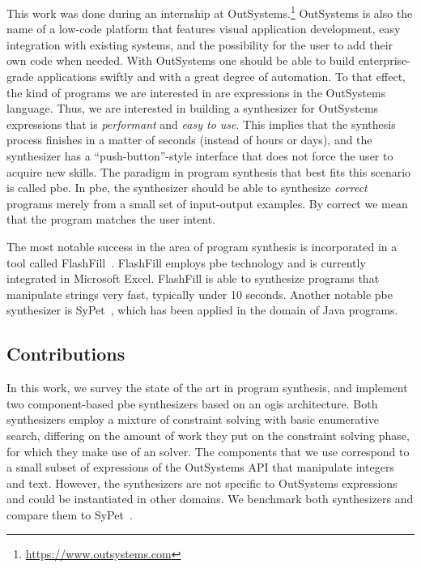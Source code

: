 This work was done during an internship at
OutSystems.\footnote{\url{https://www.outsystems.com}} 
OutSystems is also the name of a low-code platform that features visual
application development, easy integration with existing systems, and the
possibility for the user to add their own code when needed.
With OutSystems one should be able to build enterprise-grade applications
swiftly and with a great degree of
automation.
To that effect, the kind of programs we are interested in are expressions in the
OutSystems language.
Thus, we are interested in building a synthesizer for OutSystems expressions
that is \textit{performant} and \textit{easy to use}.
This implies that the synthesis process finishes in a matter of seconds
(instead of hours or days), and the synthesizer has a ``push-button''-style
interface that does not force the user to acquire new skills.
The paradigm in program synthesis that best fits this scenario is called
\gls{pbe}.
In \gls{pbe}, the synthesizer should be able to synthesize \textit{correct}
programs merely from a small set of input-output examples.
By correct we mean that the program matches the user intent.

The most notable success in the area of program synthesis is incorporated in a
tool called FlashFill~\cite{Gulwani:2011}.
FlashFill employs \gls{pbe} technology and is currently integrated in Microsoft
Excel.
FlashFill is able to synthesize programs that manipulate strings very fast,
typically under 10 seconds.
Another notable \gls{pbe} synthesizer is SyPet~\cite{Feng:2017:CSC}, which has
been applied in the domain of Java programs.

\subsection{Contributions}

In this work, we survey the state of the art in program synthesis, and
implement two component-based \gls{pbe} synthesizers based on an \gls{ogis}
architecture.
Both synthesizers employ a mixture of constraint solving with basic enumerative
search, differing on the amount of work they put on the constraint solving
phase, for which they make use of an  solver.
The components that we use correspond to a small subset of expressions of the
OutSystems API that manipulate integers and text.
However, the synthesizers are not specific to OutSystems expressions and could
be instantiated in other domains.
We benchmark both synthesizers and compare them to SyPet~\cite{Feng:2017:CSC}.